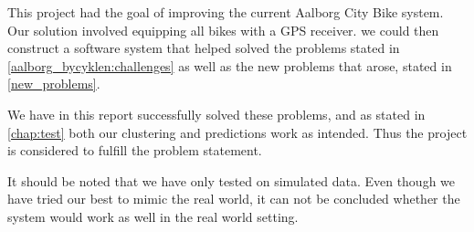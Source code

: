 This project had the goal of improving the current Aalborg City Bike system.
Our solution involved equipping all bikes with a GPS receiver. we could then construct a software system that helped solved the problems stated in \ref{aalborg_bycyklen:challenges} as well as the new problems that arose, stated in \ref{new_problems}.

We have in this report successfully solved these problems, and as stated in \ref{chap:test} both our clustering and predictions work as intended.
Thus the project is considered to fulfill the problem statement.

It should be noted that we have only tested on simulated data.
Even though we have tried our best to mimic the real world, it can not be concluded whether the system would work as well in the real world setting.